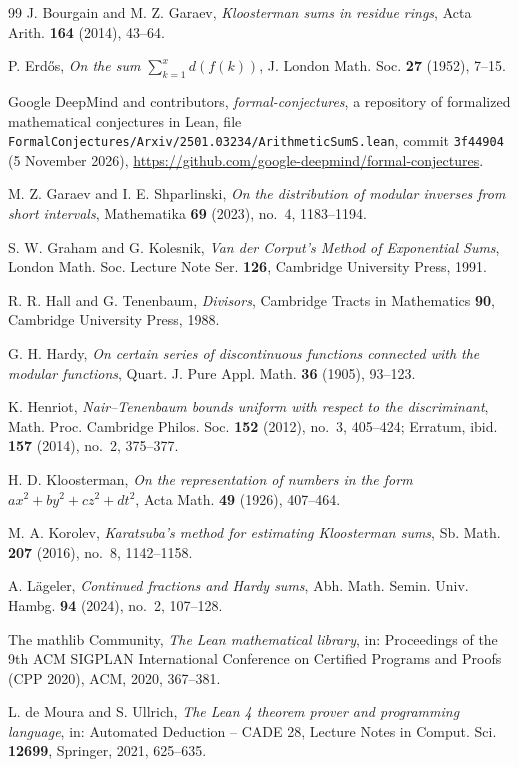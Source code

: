 \begin{thebibliography}{99}
 J. Bourgain and M. Z. Garaev, \emph{Kloosterman sums in residue rings}, Acta Arith. \textbf{164} (2014), 43--64.

 P. Erd\H{o}s, \emph{On the sum $\sum_{k=1}^{x}d(f(k))$}, J. London Math. Soc. \textbf{27} (1952), 7--15.

 Google DeepMind and contributors, \emph{formal-conjectures}, a repository of formalized mathematical conjectures in Lean, file \texttt{FormalConjectures/Arxiv/2501.03234/ArithmeticSumS.lean}, commit \texttt{3f44904} (5 November 2026), \url{https://github.com/google-deepmind/formal-conjectures}.

 M. Z. Garaev and I. E. Shparlinski, \emph{On the distribution of modular inverses from short intervals}, Mathematika \textbf{69} (2023), no.~4, 1183--1194.

 S. W. Graham and G. Kolesnik, \emph{Van der Corput's Method of Exponential Sums}, London Math. Soc. Lecture Note Ser. \textbf{126}, Cambridge University Press, 1991.

 R. R. Hall and G. Tenenbaum, \emph{Divisors}, Cambridge Tracts in Mathematics \textbf{90}, Cambridge University Press, 1988.

 G. H. Hardy, \emph{On certain series of discontinuous functions connected with the modular functions}, Quart. J. Pure Appl. Math. \textbf{36} (1905), 93--123.

 K. Henriot, \emph{Nair--Tenenbaum bounds uniform with respect to the discriminant}, Math. Proc. Cambridge Philos. Soc. \textbf{152} (2012), no.~3, 405--424; Erratum, ibid. \textbf{157} (2014), no.~2, 375--377.

 H. D. Kloosterman, \emph{On the representation of numbers in the form $ax^2+by^2+cz^2+dt^2$}, Acta Math. \textbf{49} (1926), 407--464.

 M. A. Korolev, \emph{Karatsuba's method for estimating Kloosterman sums}, Sb. Math. \textbf{207} (2016), no.~8, 1142--1158.

 A. L\"ageler, \emph{Continued fractions and Hardy sums}, Abh. Math. Semin. Univ. Hambg. \textbf{94} (2024), no.~2, 107--128.

 The mathlib Community, \emph{The Lean mathematical library}, in: Proceedings of the 9th ACM SIGPLAN International Conference on Certified Programs and Proofs (CPP 2020), ACM, 2020, 367--381.

 L. de Moura and S. Ullrich, \emph{The Lean 4 theorem prover and programming language}, in: Automated Deduction -- CADE 28, Lecture Notes in Comput. Sci. \textbf{12699}, Springer, 2021, 625--635.


\end{thebibliography}
